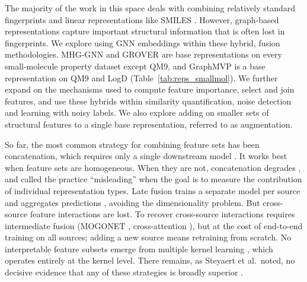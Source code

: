 The majority of the work in this space deals with combining relatively standard fingerprints and linear representations like SMILES \citep{Xie2020, Laufktter2019}. However, graph-based representations capture important structural information that is often lost in fingerprints. We explore using GNN embeddings within these hybrid, fusion methodologies. MHG-GNN and GROVER are base representations on every small-molecule property dataset except QM9, and GraphMVP is a base representation on QM9 and LogD (Table~\ref{tab:reps_smallmol}). We further expand on the mechanisms used to compute feature importance, select and join features, and use these hybrids within similarity quantification, noise detection and learning with noisy labels. We also explore adding on smaller sets of structural features to a single base representation, referred to as augmentation.

So far, the most common strategy for combining feature sets has been concatenation, which requires only a single downstream model \citep{Stahlschmidt2022}. It works best when feature sets are homogeneous. When they are not, concatenation degrades \citep{Stahlschmidt2022}, and \cite{Deng2023} called the practice ``misleading'' when the goal is to measure the contribution of individual representation types. Late fusion trains a separate model per source and aggregates predictions \citep{Steyaert2023}, avoiding the dimensionality problem. But cross-source feature interactions are lost. To recover cross-source interactions requires intermediate fusion (MOGONET \citep{Wang2021}, cross-attention \citep{Zhang2024}), but at the cost of end-to-end training on all sources; adding a new source means retraining from scratch. No interpretable feature subsets emerge from multiple kernel learning \citep{Gonen2011}, which operates entirely at the kernel level. There remains, as Steyaert et al.\ noted, no decisive evidence that any of these strategies is broadly superior \citep{Steyaert2023}.

